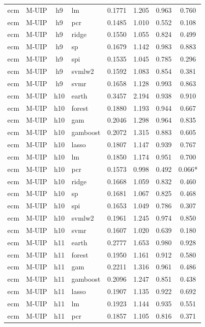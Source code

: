 \begin{ThreePartTable}
\begin{longtable}[t]{llclcccc}
ecm & M-UIP & h9 & lm & 0.1771 & 1.205 & 0.963 & 0.760\\
ecm & M-UIP & h9 & pcr & 0.1485 & 1.010 & 0.552 & 0.108\\
ecm & M-UIP & h9 & ridge & 0.1550 & 1.055 & 0.824 & 0.499\\
ecm & M-UIP & h9 & sp & 0.1679 & 1.142 & 0.983 & 0.883\\
ecm & M-UIP & h9 & spi & 0.1535 & 1.045 & 0.785 & 0.296\\
ecm & M-UIP & h9 & svmlw2 & 0.1592 & 1.083 & 0.854 & 0.381\\
ecm & M-UIP & h9 & svmr & 0.1658 & 1.128 & 0.993 & 0.863\\
\addlinespace
ecm & M-UIP & h10 & earth & 0.3457 & 2.194 & 0.938 & 0.910\\
ecm & M-UIP & h10 & forest & 0.1880 & 1.193 & 0.944 & 0.667\\
ecm & M-UIP & h10 & gam & 0.2046 & 1.298 & 0.964 & 0.835\\
ecm & M-UIP & h10 & gamboost & 0.2072 & 1.315 & 0.883 & 0.605\\
ecm & M-UIP & h10 & lasso & 0.1807 & 1.147 & 0.939 & 0.767\\
ecm & M-UIP & h10 & lm & 0.1850 & 1.174 & 0.951 & 0.700\\
ecm & M-UIP & h10 & pcr & 0.1573 & 0.998 & 0.492 & 0.066*\\
ecm & M-UIP & h10 & ridge & 0.1668 & 1.059 & 0.832 & 0.460\\
ecm & M-UIP & h10 & sp & 0.1681 & 1.067 & 0.825 & 0.468\\
ecm & M-UIP & h10 & spi & 0.1653 & 1.049 & 0.786 & 0.307\\
ecm & M-UIP & h10 & svmlw2 & 0.1961 & 1.245 & 0.974 & 0.850\\
ecm & M-UIP & h10 & svmr & 0.1607 & 1.020 & 0.639 & 0.180\\
\addlinespace
ecm & M-UIP & h11 & earth & 0.2777 & 1.653 & 0.980 & 0.928\\
ecm & M-UIP & h11 & forest & 0.1950 & 1.161 & 0.912 & 0.580\\
ecm & M-UIP & h11 & gam & 0.2211 & 1.316 & 0.961 & 0.486\\
ecm & M-UIP & h11 & gamboost & 0.2096 & 1.247 & 0.851 & 0.438\\
ecm & M-UIP & h11 & lasso & 0.1907 & 1.135 & 0.922 & 0.692\\
ecm & M-UIP & h11 & lm & 0.1923 & 1.144 & 0.935 & 0.551\\
ecm & M-UIP & h11 & pcr & 0.1857 & 1.105 & 0.816 & 0.371\\

\end{longtable}
\end{ThreePartTable}
